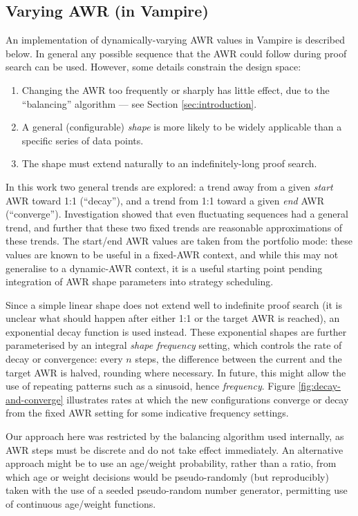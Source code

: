 \documentclass{llncs}
\begin{document}
\subsection{Varying AWR (in Vampire)} \label{sec:varying:implementation}
An implementation of dynamically-varying AWR values in Vampire is described below.
In general any possible sequence that the AWR could follow during proof search can be used.
However, some details constrain the design space:
\begin{enumerate}
	\item Changing the AWR too frequently or sharply has little effect, due to the ``balancing'' algorithm --- see Section \ref{sec:introduction}.
	\item A general (configurable) \emph{shape} is more likely to be widely applicable than a specific series of data points.
	\item The shape must extend naturally to an indefinitely-long proof search.
\end{enumerate}

In this work two general trends are explored: a trend away from a given \emph{start} AWR toward 1:1 (``decay''), and a trend from 1:1 toward a given \emph{end} AWR (``converge'').
Investigation showed that even fluctuating sequences had a general trend, and further that these two fixed trends are reasonable approximations of these trends.
The start/end AWR values are taken from the portfolio mode: these values are known to be useful in a fixed-AWR context, and while this may not generalise to a dynamic-AWR context, it is a useful starting point pending integration of AWR shape parameters into strategy scheduling.

Since a simple linear shape does not extend well to indefinite proof search (it is unclear what should happen after either 1:1 or the target AWR is reached), an exponential decay function is used instead.
These exponential shapes are further parameterised by an integral \emph{shape frequency} setting, which controls the rate of decay or convergence: every \(n\) steps, the difference between the current and the target AWR is halved, rounding where necessary.
In future, this might allow the use of repeating patterns such as a sinusoid, hence \emph{frequency}.
Figure \ref{fig:decay-and-converge} illustrates rates at which the new configurations converge or decay from the fixed AWR setting for some indicative frequency settings.

Our approach here was restricted by the balancing algorithm used internally, as AWR steps must be discrete and do not take effect immediately.
An alternative approach might be to use an age/weight probability, rather than a ratio, from which age or weight decisions would be pseudo-randomly (but reproducibly) taken with the use of a seeded pseudo-random number generator, permitting use of continuous age/weight functions.
\end{document}
